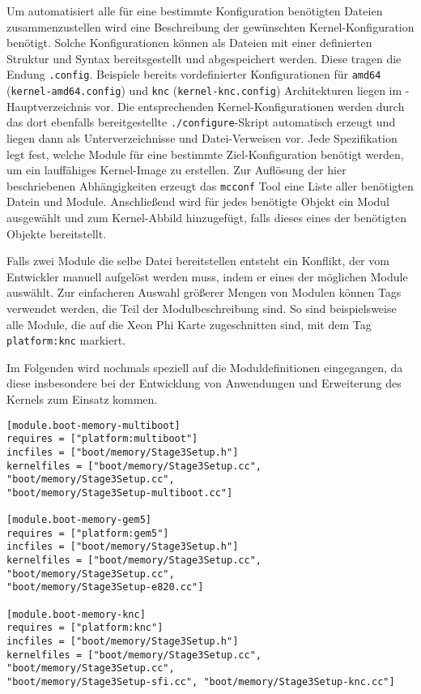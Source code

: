 Um automatisiert alle für eine bestimmte Konfiguration benötigten Dateien
zusammenzustellen wird eine Beschreibung der gewünschten Kernel-Konfiguration
benötigt. Solche Konfigurationen können als Dateien mit einer definierten
Struktur und Syntax bereitsgestellt und abgespeichert werden. Diese tragen die
Endung \texttt{.config}. Beispiele bereits vordefinierter Konfigurationen für
\texttt{amd64} (\texttt{kernel-amd64.config}) und \texttt{knc}
(\texttt{kernel-knc.config}) Architekturen liegen im \mythos-Hauptverzeichnis
vor. Die entsprechenden Kernel-Konfigurationen werden durch das dort ebenfalls
bereitgestellte \texttt{./configure}-Skript automatisch erzeugt und liegen dann
als Unterverzeichnisse und Datei-Verweisen vor. Jede Spezifikation legt fest,
welche Module für eine bestimmte Ziel-Konfiguration benötigt werden, um ein
lauffähiges Kernel-Image zu erstellen. Zur Auflösung der hier
beschriebenen Abhängigkeiten erzeugt das \texttt{mcconf} Tool eine Liste aller
benötigten Datein und Module. Anschließend wird für jedes benötigte Objekt ein
Modul ausgewählt und zum Kernel-Abbild hinzugefügt, falls dieses eines der
benötigten Objekte bereitstellt. 

Falls zwei Module die selbe Datei bereitstellen entsteht ein Konflikt, der vom
Entwickler manuell aufgelöst werden muss, indem er eines der möglichen Module
auswählt. Zur einfacheren Auswahl größerer Mengen von Modulen können Tags
verwendet werden, die Teil der Modulbeschreibung sind. So sind beispielsweise
alle Module, die auf die Xeon Phi Karte zugeschnitten sind, mit dem Tag
\texttt{platform:knc} markiert.

Im Folgenden wird nochmals speziell auf die Moduldefinitionen eingegangen, da
diese insbesondere bei der Entwicklung von Anwendungen und Erweiterung des
Kernels zum Einsatz kommen.

\begin{lstlisting}[float, label=lst:module, caption=Ein Beispiel einer 
Modulbeschreibung (\texttt{mcconf.module}).]
[module.boot-memory-multiboot]
requires = ["platform:multiboot"]
incfiles = ["boot/memory/Stage3Setup.h"]
kernelfiles = ["boot/memory/Stage3Setup.cc", "boot/memory/Stage3Setup.cc", 
"boot/memory/Stage3Setup-multiboot.cc"]

[module.boot-memory-gem5]
requires = ["platform:gem5"]
incfiles = ["boot/memory/Stage3Setup.h"]
kernelfiles = ["boot/memory/Stage3Setup.cc", "boot/memory/Stage3Setup.cc", 
"boot/memory/Stage3Setup-e820.cc"]

[module.boot-memory-knc]
requires = ["platform:knc"]
incfiles = ["boot/memory/Stage3Setup.h"]
kernelfiles = ["boot/memory/Stage3Setup.cc", "boot/memory/Stage3Setup.cc", 
"boot/memory/Stage3Setup-sfi.cc", "boot/memory/Stage3Setup-knc.cc"]
\end{lstlisting}


